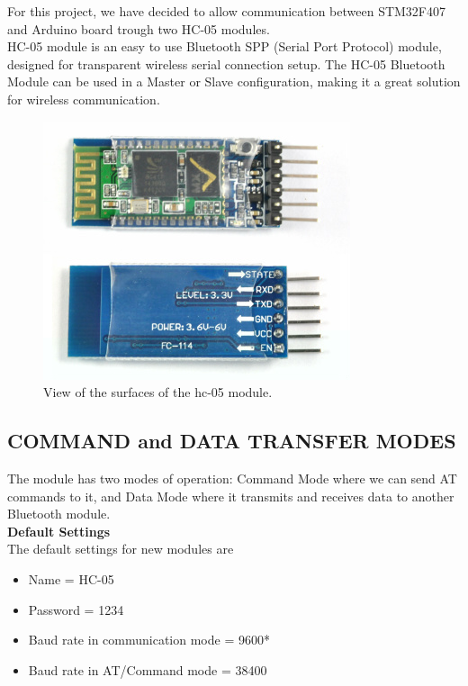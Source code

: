 \author{Yuri}
For this project, we have decided to allow communication between STM32F407 and Arduino board trough two HC-05 modules.\\
HC-05 module is an easy to use Bluetooth SPP (Serial Port Protocol) module, designed for transparent wireless serial connection setup. The HC-05 Bluetooth Module can be used in a Master or Slave configuration, making it a great solution for wireless communication.\\

\begin{figure}[H]
	\centering
	\includegraphics[width=\textwidth]
	{files/images/hc05_view}
	\caption{View of the surfaces of the hc-05 module.}
\end{figure}

\subsection{COMMAND and DATA TRANSFER MODES}
The module has two modes of operation: Command Mode where we can send AT commands to it, and Data Mode where it transmits and receives data to another Bluetooth module.\\

\textbf{Default Settings}\\
The default settings for new modules are
\begin{itemize}
\item Name = HC-05
\item Password = 1234
\item Baud rate in communication mode = 9600*
\item Baud rate in AT/Command mode = 38400
\end{itemize}

